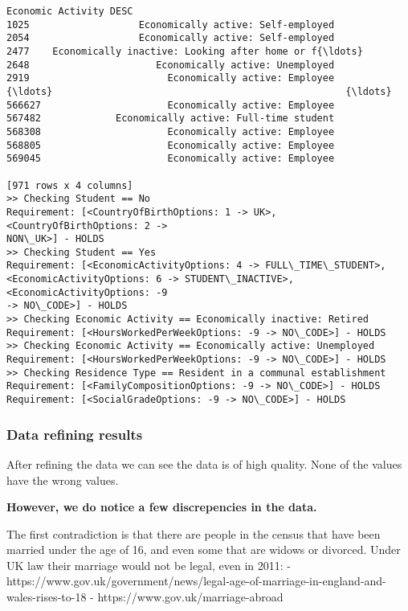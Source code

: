 \documentclass[11pt]{article}
\begin{document}
\begin{Verbatim}[commandchars=\\\{\}]
                                   Economic Activity DESC
1025                   Economically active: Self-employed
2054                   Economically active: Self-employed
2477    Economically inactive: Looking after home or f{\ldots}
2648                      Economically active: Unemployed
2919                        Economically active: Employee
{\ldots}                                                   {\ldots}
566627                      Economically active: Employee
567482             Economically active: Full-time student
568308                      Economically active: Employee
568805                      Economically active: Employee
569045                      Economically active: Employee

[971 rows x 4 columns]
>> Checking Student == No
Requirement: [<CountryOfBirthOptions: 1 -> UK>, <CountryOfBirthOptions: 2 ->
NON\_UK>] - HOLDS
>> Checking Student == Yes
Requirement: [<EconomicActivityOptions: 4 -> FULL\_TIME\_STUDENT>,
<EconomicActivityOptions: 6 -> STUDENT\_INACTIVE>, <EconomicActivityOptions: -9
-> NO\_CODE>] - HOLDS
>> Checking Economic Activity == Economically inactive: Retired
Requirement: [<HoursWorkedPerWeekOptions: -9 -> NO\_CODE>] - HOLDS
>> Checking Economic Activity == Economically active: Unemployed
Requirement: [<HoursWorkedPerWeekOptions: -9 -> NO\_CODE>] - HOLDS
>> Checking Residence Type == Resident in a communal establishment
Requirement: [<FamilyCompositionOptions: -9 -> NO\_CODE>] - HOLDS
Requirement: [<SocialGradeOptions: -9 -> NO\_CODE>] - HOLDS
    \end{Verbatim}

    \subsubsection{\texorpdfstring{\textbf{Data refining
results}}{Data refining results}}\label{data-refining-results}

After refining the data we can see the data is of high quality. None of
the values have the wrong values.

\textbf{However, we do notice a few discrepencies in the data.}

The first contradiction is that there are people in the census that have
been married under the age of 16, and even some that are widows or
divorced. Under UK law their marriage would not be legal, even in 2011:
-
https://www.gov.uk/government/news/legal-age-of-marriage-in-england-and-wales-rises-to-18
- https://www.gov.uk/marriage-abroad
\end{document}
